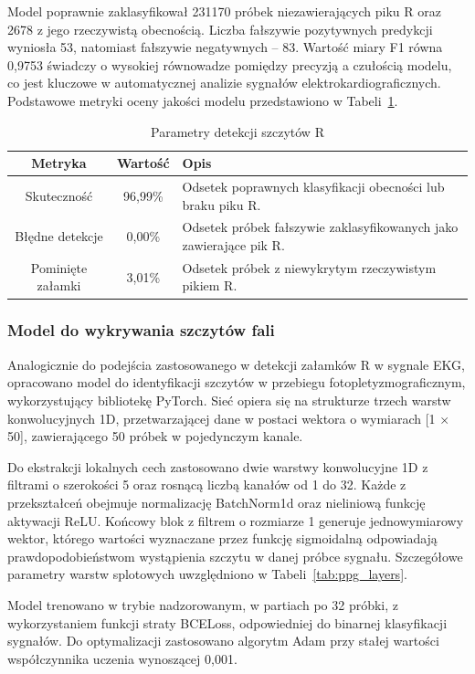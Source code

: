 \documentclass[journal]{IEEEtran}
\begin{document}
\newpage
Model poprawnie zaklasyfikował 231170 próbek niezawierających piku R oraz 2678 z jego rzeczywistą obecnością. Liczba fałszywie pozytywnych predykcji wyniosła 53, natomiast fałszywie negatywnych -- 83. Wartość miary F1 równa 0,9753 świadczy o wysokiej równowadze pomiędzy precyzją a czułością modelu, co jest kluczowe w automatycznej analizie sygnałów elektrokardiograficznych. Podstawowe metryki oceny jakości modelu przedstawiono w Tabeli~\ref{tab:metrics}.

\begin{table}[ht]
\centering
\caption{Parametry detekcji szczytów R}
\label{tab:metrics}
\begin{tabular}{|c|c|p{4.6cm}|}
\hline
\textbf{Metryka} & \textbf{Wartość} & \textbf{Opis} \\
\hline
Skuteczność & 96,99\% & Odsetek poprawnych klasyfikacji obecności lub braku piku R. \\
\hline
Błędne detekcje & 0,00\% & Odsetek próbek fałszywie zaklasyfikowanych jako zawierające pik R. \\
\hline
Pominięte załamki & 3,01\% & Odsetek próbek z niewykrytym rzeczywistym pikiem R. \\
\hline
\end{tabular}
\end{table}

\subsubsection{Model do wykrywania szczytów fali}
Analogicznie do podejścia zastosowanego w detekcji załamków R w sygnale EKG, opracowano model do identyfikacji szczytów w przebiegu fotopletyzmograficznym, wykorzystujący bibliotekę PyTorch. Sieć opiera się na strukturze trzech warstw konwolucyjnych 1D, przetwarzającej dane w postaci wektora o wymiarach [1 × 50], zawierającego 50 próbek w pojedynczym kanale.

Do ekstrakcji lokalnych cech zastosowano dwie warstwy konwolucyjne 1D z filtrami o szerokości 5 oraz rosnącą liczbą kanałów od 1 do 32. Każde z przekształceń obejmuje normalizację BatchNorm1d oraz nieliniową funkcję aktywacji ReLU. Końcowy blok z filtrem o rozmiarze 1 generuje jednowymiarowy wektor, którego wartości wyznaczane przez funkcję sigmoidalną odpowiadają prawdopodobieństwom wystąpienia szczytu w danej próbce sygnału. Szczegółowe parametry warstw splotowych uwzględniono w Tabeli~\ref{tab:ppg_layers}.

Model trenowano w trybie nadzorowanym, w partiach po 32 próbki, z wykorzystaniem funkcji straty BCELoss, odpowiedniej do binarnej klasyfikacji sygnałów. Do optymalizacji zastosowano algorytm Adam przy stałej wartości współczynnika uczenia wynoszącej 0,001.
\end{document}
